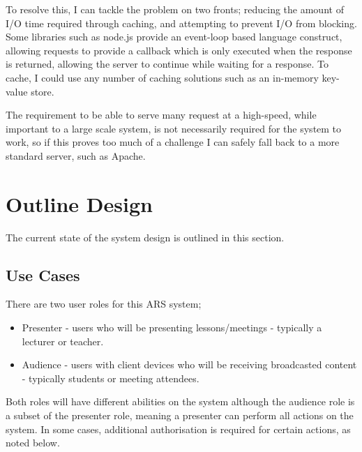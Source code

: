 \documentclass[a4papert,11pt,notitlepage]{ltxdoc}
\begin{document}
To resolve this, I can tackle the problem on two fronts; reducing the amount of I/O time required through caching, and attempting to prevent I/O from blocking. Some libraries such as node.js provide an event-loop based language construct, allowing requests to provide a callback which is only executed when the response is returned, allowing the server to continue while waiting for a response. To cache, I could use any number of caching solutions such as an in-memory key-value store.

The requirement to be able to serve many request at a high-speed, while important to a large scale system, is not necessarily required for the system to work, so if this proves too much of a challenge I can safely fall back to a more standard server, such as Apache.

\section{Outline Design}
The current state of the system design is outlined in this section.

\subsection{Use Cases}
There are two user roles for this ARS system;
\begin{itemize}
\item Presenter - users who will be presenting lessons/meetings - typically a lecturer or teacher.
\item Audience - users with client devices who will be receiving broadcasted content - typically students or meeting attendees.
\end{itemize}

Both roles will have different abilities on the system although the audience role is a subset of the presenter role, meaning a presenter can perform all actions on the system. In some cases, additional authorisation is required for certain actions, as noted below.
\end{document}
